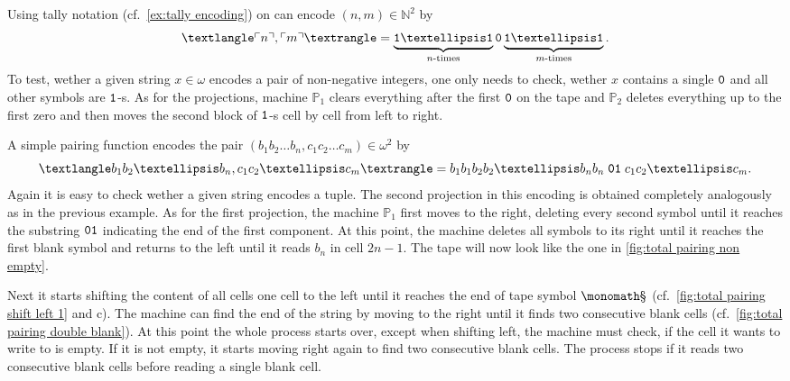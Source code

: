 \begin{exam}
  \begin{exlist}
    \item\label{ex:tally pairing}
    Using tally notation (cf.~\cref{ex:tally encoding}) on can encode \((n, m) ∈
    ℕ^2\) by
    \[
      ⟨\enc{n}, \enc{m}⟩ =
        \underbrace{\one … \one}_{n\text{-times}} \zer
        \underbrace{\one … \one}_{m\text{-times}}.
    \]
    To test, wether a given string \(x ∈ ω\) encodes a pair of non-negative
    integers, one only needs to check, wether \(x\) contains a single \(\mathtt{0}\)
    and all other symbols are \(\mathtt{1}\)-s. As for the projections, machine
    \(\mathbb{P}_1\) clears everything after the first \(\mathtt{0}\) on the tape and
    \(\mathbb{P}_2\) deletes everything up to the first zero and then moves the
    second block of \(\mathtt{1}\)-s cell by cell from left to right.

    \item\label{ex:total pairing}
    A simple pairing function encodes the pair \((b_1b_2…b_n, c_1c_2…c_m) ∈ ω^2\)
    by
    \[
      ⟨b_1b_2…b_n, c_1c_2…c_m⟩ = b_1b_1b_2b_2…b_nb_n \; \zer\one \; c_1c_2…c_m.
    \]
    Again it is easy to check wether a given string encodes a tuple. The second
    projection in this encoding is obtained completely analogously as in the
    previous example. As for the first projection, the machine \(\mathbb{P}_1\)
    first moves to the right, deleting every second symbol until it reaches the
    substring \(\mathtt{0}\mathtt{1}\) indicating the end of the first component. At this
    point, the machine deletes all symbols to its right until it reaches the
    first blank symbol and returns to the left until it reads \(b_n\) in cell
    \(2n - 1\). The tape will now look like the one in \cref{fig:total pairing
    non empty}.

    Next it starts shifting the content of all cells one cell to the left until
    it reaches the end of tape symbol \(\sta\) (cf.~\cref{fig:total pairing
    shift left 1} and c). The machine can find the end of the string by moving
    to the right until it finds two consecutive blank cells (cf.~\cref{fig:total
    pairing double blank}). At this point the whole process starts over, except
    when shifting left, the machine must check, if the cell it wants to write to
    is empty. If it is not empty, it starts moving right again to find two
    consecutive blank cells. The process stops if it reads two consecutive blank
    cells before reading a single blank cell.
  \end{exlist}
\end{exam}

